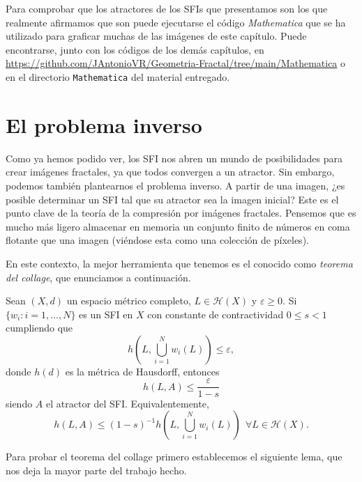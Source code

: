 Para comprobar que los atractores de los SFIs que presentamos son los que realmente afirmamos que son puede ejecutarse el código \textit{Mathematica} que se ha utilizado para graficar muchas de las imágenes de este capítulo. Puede encontrarse, junto con los códigos de los demás capítulos, en \url{https://github.com/JAntonioVR/Geometria-Fractal/tree/main/Mathematica} o en el directorio \texttt{Mathematica} del material entregado.


\section{El problema inverso}
\label{section:problema-inverso}

Como ya hemos podido ver, los SFI nos abren un mundo de posibilidades para crear imágenes fractales, ya que todos convergen a un atractor. Sin embargo, podemos también plantearnos el problema inverso. A partir de una imagen, ¿es posible determinar un SFI tal que su atractor sea la imagen inicial? Este es el punto clave de la teoría de la compresión por imágenes fractales. Pensemos que es mucho más ligero almacenar en memoria un conjunto finito de números en coma flotante que una imagen (viéndose esta como una colección de píxeles).

En este contexto, la mejor herramienta que tenemos es el conocido como \textit{teorema del collage}, que enunciamos a continuación.

\begin{teorema}
    \label{th:collage}
    Sean $(X,d)$ un espacio métrico completo, $L\in\mathcal{H}(X)$ y $\varepsilon\geq 0$. Si $\{w_i:i=1,\dots,N\}$ es un SFI en $X$ con constante de contractividad $0\leq s < 1$ cumpliendo que
    $$
    h\left(L,\bigcup_{i=1}^N w_i(L)\right) \leq \varepsilon,
    $$
    donde $h(d)$ es la métrica de Hausdorff, entonces
    $$
    h(L,A)\leq \dfrac{\varepsilon}{1-s}
    $$
    siendo $A$ el atractor del SFI. Equivalentemente,
    $$
    h(L,A)\leq(1-s)^{-1} h\left(L, \bigcup_{i=1}^N w_i(L)\right) \ \ \forall L\in\mathcal{H}(X).
    $$
\end{teorema}

Para probar el teorema del collage primero establecemos el siguiente lema, que nos deja la mayor parte del trabajo hecho.

